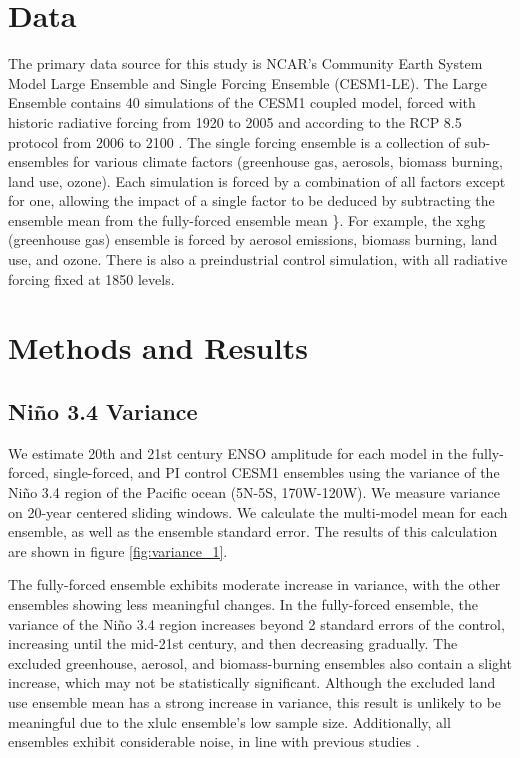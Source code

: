 \documentclass[12pt]{article}
\begin{document}
\section{Data}
The primary data source for this study is NCAR's Community Earth System Model Large Ensemble and Single Forcing Ensemble (CESM1-LE). The Large Ensemble contains 40 simulations of the CESM1 coupled model, forced with historic radiative forcing from 1920 to 2005 and according to the RCP 8.5 protocol from 2006 to 2100 \parencite{kay2015community}. The single forcing ensemble is a collection of sub-ensembles for various climate factors (greenhouse gas, aerosols, biomass burning, land use, ozone). Each simulation is forced by a combination of all factors except for one, allowing the impact of a single factor to be deduced by subtracting the ensemble mean from the fully-forced ensemble mean \parencite{deser2020isolating}\}. For example, the xghg (greenhouse gas) ensemble is forced by aerosol emissions, biomass burning, land use, and ozone. There is also a preindustrial control simulation, with all radiative forcing fixed at 1850 levels.

\section{Methods and Results}

\subsection{Niño 3.4 Variance}
We estimate 20th and 21st century ENSO amplitude for each model in the fully-forced, single-forced, and PI control CESM1 ensembles using the variance of the Niño 3.4 region of the Pacific ocean (5N-5S, 170W-120W). We measure variance on 20-year centered sliding windows. We calculate the multi-model mean for each ensemble, as well as the ensemble standard error. The results of this calculation are shown in figure \ref{fig:variance_1}.

The fully-forced ensemble exhibits moderate increase in variance, with the other ensembles showing less meaningful changes. In the fully-forced ensemble, the variance of the Niño 3.4 region increases beyond 2 standard errors of the control, increasing until the mid-21st century, and then decreasing gradually. The excluded greenhouse, aerosol, and biomass-burning ensembles also contain a slight increase, which may not be statistically significant. Although the excluded land use ensemble mean has a strong increase in variance, this result is unlikely to be meaningful due to the xlulc ensemble's low sample size. Additionally, all ensembles exhibit considerable noise, in line with previous studies \parencite{maher2018enso}.
\end{document}

